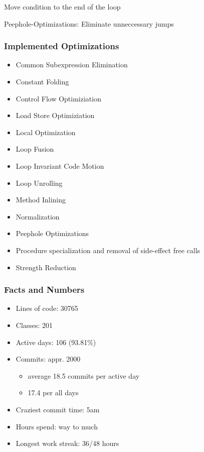 \documentclass[t]{beamer}
\begin{document}
\begin{frame}
\begin{itemize}
 {\item Move condition to the end of the loop}
 {\item Peephole-Optimizations: Eliminate unneccessary jumps}
\end{itemize}
\end{frame}

\begin{frame}
  \frametitle{Implemented Optimizations}
\begin{itemize}
\item Common Subexpression Elimination
\item Constant Folding
\item Control Flow Optimiziation
\item Load Store Optimiziation
\item Local Optimization
\item Loop Fusion
\item Loop Invariant Code Motion
\item Loop Unrolling
\item Method Inlining
\item Normalization
\item Peephole Optimizations
\item Procedure specialization and removal of side-effect free calls
\item Strength Reduction
\end{itemize}
\end{frame}

\begin{frame}
  \frametitle{Facts and Numbers}
\begin{itemize}
\item Lines of code: 30765
\item Classes: 201
\item Active days: 106 (93.81\%)
\item Commits: appr. 2000
\begin{itemize}
	\item average 18.5 commits per active day
	\item 17.4 per all days
\end{itemize}
\item Craziest commit time: 5am
\item Hours spend: way to much
\item Longest work streak: 36/48 hours
\end{itemize}
\end{frame}
\end{document}

